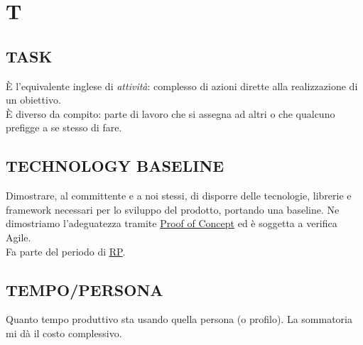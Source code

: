 \newpage
	\section{T} \label{sec:T}

		\subsection{TASK}  \label{task}
		È l'equivalente inglese di \textit{attività}: complesso di azioni dirette alla realizzazione di un obiettivo. \\
		È diverso da compito: parte di lavoro che si assegna ad altri o che qualcuno prefigge a se stesso di fare.

		\subsection{TECHNOLOGY BASELINE}  \label{technologybaseline}
		Dimostrare, al committente e a noi stessi, di disporre delle tecnologie, librerie e framework necessari per lo sviluppo del prodotto, portando una baseline.
		Ne dimostriamo l'adeguatezza tramite \underline{\hyperref[poc]{Proof of Concept}} ed è soggetta a verifica Agile. \\
		Fa parte del periodo di \underline{\hyperref[RP]{RP}}.

		\subsection{TEMPO/PERSONA}  \label{tempopersona}
		Quanto tempo produttivo sta usando quella persona (o profilo). La sommatoria mi dà il costo complessivo.

